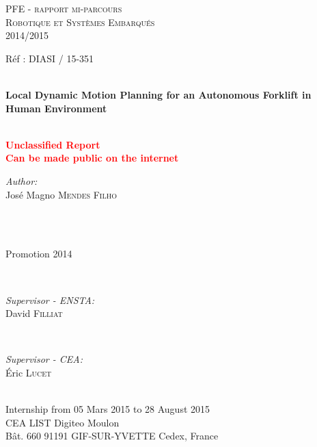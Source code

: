 \begin{titlepage}

\textsc{\LARGE PFE - rapport mi-parcours}\\[0.3cm]
\textsc{\Large Robotique et Systèmes Embarqués}\\[0.3cm]
\Large{2014/2015}\\[0.6cm]


{Réf : DIASI / 15-351 \hfill}

\HRule \\[0.2cm]
\Huge \textbf{Local Dynamic Motion Planning for an Autonomous Forklift in Human Environment}\\[-0.2cm] %
\HRule \\[0.5cm]

\begin{center}
\textbf{\textcolor{red}{\Large{
Unclassified Report}\\[-0.4cm]%
\large{Can be made public on the internet}
}}
\end{center}

\begin{minipage}{0.55\textwidth}
\begin{flushleft} \Large
\emph{Author:}\\
José Magno \textsc{Mendes Filho} \\[0.7cm] %
\end{flushleft}
\end{minipage}
~
\begin{minipage}{0.35\textwidth}
\begin{flushright} \Large
\mbox{}\\[0.4cm]
Promotion 2014
\end{flushright}
\end{minipage}\\[1.0cm]

\begin{minipage}{0.45\textwidth}
\begin{flushleft} \large
\emph{Supervisor - ENSTA:}\\
David \textsc{Filliat} %
\end{flushleft}
\end{minipage}
~
\begin{minipage}{0.45\textwidth}
\begin{flushright} \large
\emph{Supervisor - CEA:} \\
Éric \textsc{Lucet} %
\end{flushright}
\end{minipage}\\[1.0cm]

\large{Internship from 05 Mars 2015 to 28 August 2015}\\[0.6cm]
\large{CEA LIST Digiteo Moulon\\ Bât. 660 91191 GIF-SUR-YVETTE Cedex, France}
\end{titlepage}

